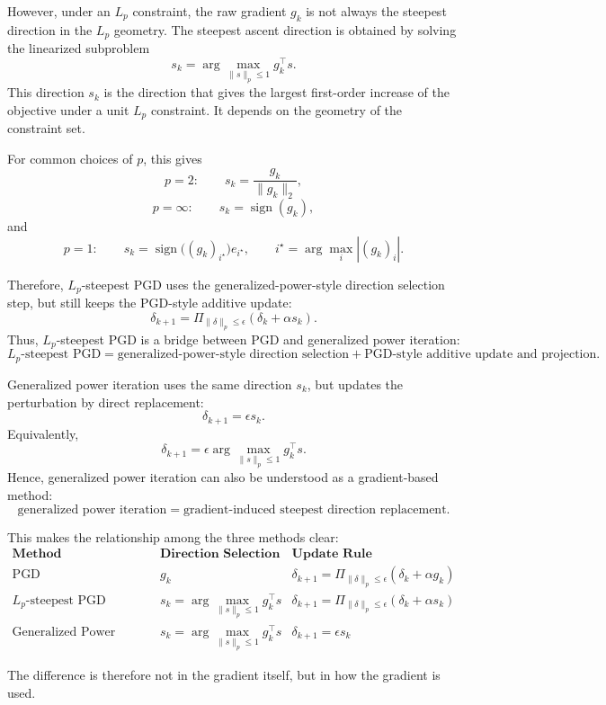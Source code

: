 \documentclass{article}
\begin{document}
However, under an $L_p$ constraint, the raw gradient $g_k$ is not always the steepest direction in the $L_p$ geometry. The steepest ascent direction is obtained by solving the linearized subproblem
\[
s_k
=
\arg\max_{\|s\|_p\le1}
g_k^\top s.
\]
This direction $s_k$ is the direction that gives the largest first-order increase of the objective under a unit $L_p$ constraint. It depends on the geometry of the constraint set.

For common choices of $p$, this gives
\[
p=2:
\qquad
s_k=\frac{g_k}{\|g_k\|_2},
\]
\[
p=\infty:
\qquad
s_k=\operatorname{sign}(g_k),
\]
and
\[
p=1:
\qquad
s_k=
\operatorname{sign}\bigl((g_k)_{i^\star}\bigr)e_{i^\star},
\qquad
i^\star=\arg\max_i |(g_k)_i|.
\]

Therefore, $L_p$-steepest PGD uses the generalized-power-style direction selection step, but still keeps the PGD-style additive update:
\[
\delta_{k+1}
=
\Pi_{\|\delta\|_p\le\epsilon}
\left(
\delta_k+\alpha s_k
\right).
\]
Thus, $L_p$-steepest PGD is a bridge between PGD and generalized power iteration:
\[
\boxed{
L_p\text{-steepest PGD}
=
\text{generalized-power-style direction selection}
+
\text{PGD-style additive update and projection}.
}
\]

Generalized power iteration uses the same direction $s_k$, but updates the perturbation by direct replacement:
\[
\delta_{k+1}
=
\epsilon s_k.
\]
Equivalently,
\[
\delta_{k+1}
=
\epsilon
\arg\max_{\|s\|_p\le1}
g_k^\top s.
\]
Hence, generalized power iteration can also be understood as a gradient-based method:
\[
\boxed{
\text{generalized power iteration}
=
\text{gradient-induced steepest direction replacement}.
}
\]

This makes the relationship among the three methods clear:
\[
\begin{array}{c|c|c}
\textbf{Method}
&
\textbf{Direction Selection}
&
\textbf{Update Rule}
\\
\hline
\text{PGD}
&
g_k
&
\delta_{k+1}
=
\Pi_{\|\delta\|_p\le\epsilon}
(\delta_k+\alpha g_k)
\\
\hline
L_p\text{-steepest PGD}
&
s_k=
\arg\max_{\|s\|_p\le1}g_k^\top s
&
\delta_{k+1}
=
\Pi_{\|\delta\|_p\le\epsilon}
(\delta_k+\alpha s_k)
\\
\hline
\text{Generalized Power Iteration}
&
s_k=
\arg\max_{\|s\|_p\le1}g_k^\top s
&
\delta_{k+1}
=
\epsilon s_k
\end{array}
\]

The difference is therefore not in the gradient itself, but in how the gradient is used.
\end{document}
